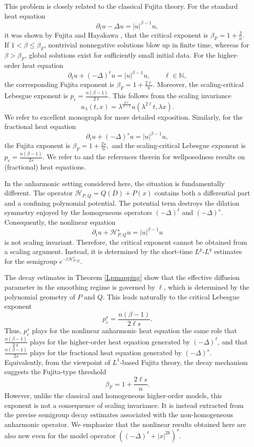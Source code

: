 \documentclass[12pt, reqno]{amsart}
\theoremstyle{definition}
\theoremstyle{remark}
\numberwithin{equation}{section}
\begin{document}
This problem is closely related to the classical Fujita theory. For the standard heat equation
\[
\partial_t u-\Delta u=|u|^{\beta-1}u,
\]
 it was shown by Fujita \cite{Fujita1966} and Hayakawa \cite{Hayakawa1973}, that the critical exponent is $\beta_F=1+\frac{2}{n}.$
If $1<\beta\leq\beta_F$, nontrivial nonnegative solutions blow up in finite time, whereas for $\beta>\beta_F$, global solutions exist for sufficiently small initial data. For the higher-order heat equation
\[
\partial_t u+(-\Delta)^\ell u=|u|^{\beta-1}u,
\qquad
\ell\in\mathbb{N},
\]
the corresponding Fujita exponent is
 $\beta_F=1+\frac{2\ell}{n}.$
Moreover, the scaling-critical Lebesgue exponent is $p_c=\frac{n(\beta-1)}{2\ell}.$
This follows from the scaling invariance
\[
u_\lambda(t,x)
=
\lambda^{\frac{2\ell}{\beta-1}}
u(\lambda^{2\ell}t,\lambda x).
\] We refer to excellent monograph \cite{GMP} for more detailed exposition.
Similarly, for the fractional heat equation
\[
\partial_t u+(-\Delta)^s u=|u|^{\beta-1}u,
\] the Fujita exponent is $\beta_F=1+\frac{2s}{n},$
and the scaling-critical Lebesgue exponent is $p_c=\frac{n(\beta-1)}{2s}.$
We refer to \cite{We,Mio,Ha,Br,MiaoL,KumarTorebek} and the references therein for wellposedness results on (fractional) heat equations.

In the anharmonic setting considered here, the situation is fundamentally different. The operator $\mathcal{H}_{P,Q}=Q(D)+P(x)$
contains both a differential part and a confining polynomial potential. The potential term destroys the dilation symmetry enjoyed by the homogeneous operators $(-\Delta)^\ell$ and $(-\Delta)^s$. Consequently, the nonlinear equation
\[
\partial_t u+\mathcal{H}_{P,Q}^s u=|u|^{\beta-1}u
\]
is not scaling invariant. Therefore, the critical exponent cannot be obtained from a scaling argument. Instead, it is determined by the short-time $L^p$-$L^q$ estimates for the semigroup $e^{-t\mathcal{H}_{P,Q}^s}$.

The decay estimates in Theorem \ref{Lpmapping} show that the effective diffusion parameter in the smoothing regime is governed by $\ell$, which is determined by the polynomial geometry of $P$ and $Q$. This leads naturally to the critical Lebesgue exponent
\[
p_c^s
=
\frac{n(\beta-1)}{2\ell s}.
\]
Thus, $p_c^s$ plays for the nonlinear anharmonic heat equation the same role that $\frac{n(\beta-1)}{2\ell}$
plays for the higher-order heat equation generated by $(-\Delta)^\ell$, and that $\frac{n(\beta-1)}{2s}$
plays for the fractional heat equation generated by $(-\Delta)^s$. Equivalently, from the viewpoint of $L^1$-based Fujita theory, the decay mechanism suggests the Fujita-type threshold
\[
\beta_F
=
1+\frac{2\ell s}{n}.
\]
However, unlike the classical and homogeneous higher-order models, this exponent is not a consequence of scaling invariance. It is instead extracted from the precise semigroup decay estimates associated with the non-homogeneous anharmonic operator.
We emphasize that the nonlinear results obtained here are also new even for the model operator $\left((-\Delta)^\ell+|x|^{2k}\right)^s.$
\end{document}
